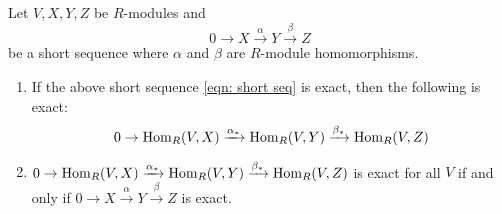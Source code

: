 \begin{thm} \label{thm: all exact}
    Let $V, X, Y, Z$ be $R$-modules and
    \begin{equation}\label{eqn: short seq}
        0\to X \xrightarrow{\alpha} Y\xrightarrow{\beta} Z
    \end{equation}
    be a short sequence where $\alpha$ and $\beta$ are $R$-module homomorphisms. 
    \begin{enumerate}
        \item If the above short sequence \ref{eqn: short seq} is exact, then the following is exact:
    \[0 \to \operatorname{Hom}_R(V,X)\xrightarrow{\alpha_*}\operatorname{Hom}_R(V,Y)\xrightarrow{\beta_*}\operatorname{Hom}_R(V,Z)\]
        \item $0 \to \operatorname{Hom}_R(V,X)\xrightarrow{\alpha_*}\operatorname{Hom}_R(V,Y)\xrightarrow{\beta_*}\operatorname{Hom}_R(V,Z)$ is exact for all $V$ if and only if $0\to X \xrightarrow{\alpha} Y\xrightarrow{\beta}Z$ is exact.
    \end{enumerate}
\end{thm}
